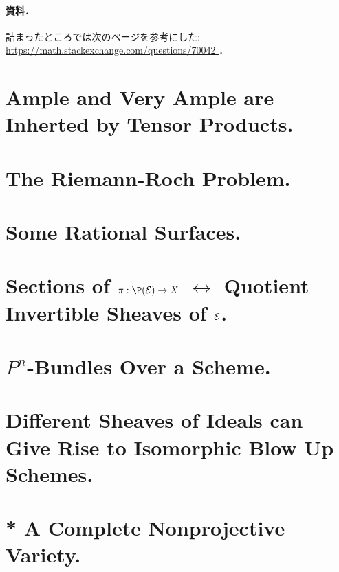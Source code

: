 \documentclass[a4paper]{jsarticle}
\begin{document}
    \paragraph{資料．}
    詰まったところでは次のページを参考にした:
    \url{ https://math.stackexchange.com/questions/70042 }．
          
\section{ Ample and Very Ample are Inherted by Tensor Products.} %
          
\section{The Riemann-Roch Problem.} %

\section{Some Rational Surfaces.} %

\section{Sections of $\pi: \P(\shE) \to X$
    $\leftrightarrow$ Quotient Invertible Sheaves of $\mathcal{E}$.} %

\section{ } %

\section{$P^n$-Bundles Over a Scheme.} %

\section{Different Sheaves of Ideals can Give Rise to Isomorphic Blow Up Schemes.} %

\section{ } %

\section{* A Complete Nonprojective Variety.} %

\section{ } %
\end{document}
